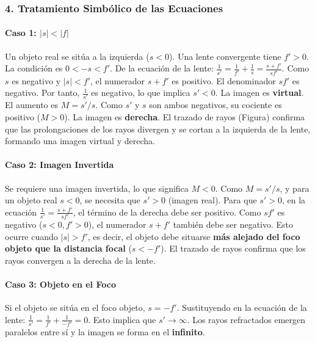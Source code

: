 \subsubsection*{4. Tratamiento Simbólico de las Ecuaciones}
\paragraph*{Caso 1: $|s| < |f|$}
Un objeto real se sitúa a la izquierda ($s<0$). Una lente convergente tiene $f' > 0$. La condición es $0 < -s < f'$.
De la ecuación de la lente: $\frac{1}{s'} = \frac{1}{f'} + \frac{1}{s} = \frac{s+f'}{s f'}$. Como $s$ es negativo y $|s| < f'$, el numerador $s+f'$ es positivo. El denominador $s f'$ es negativo. Por tanto, $\frac{1}{s'}$ es negativo, lo que implica $s'<0$. La imagen es \textbf{virtual}.
El aumento es $M = s'/s$. Como $s'$ y $s$ son ambos negativos, su cociente es positivo ($M>0$). La imagen es \textbf{derecha}.
El trazado de rayos (Figura) confirma que las prolongaciones de los rayos divergen y se cortan a la izquierda de la lente, formando una imagen virtual y derecha.

\paragraph*{Caso 2: Imagen Invertida}
Se requiere una imagen invertida, lo que significa $M<0$. Como $M = s'/s$, y para un objeto real $s<0$, se necesita que $s'>0$ (imagen real).
Para que $s'>0$, en la ecuación $\frac{1}{s'} = \frac{s+f'}{s f'}$, el término de la derecha debe ser positivo. Como $s f'$ es negativo ($s<0, f'>0$), el numerador $s+f'$ también debe ser negativo. Esto ocurre cuando $|s| > f'$, es decir, el objeto debe situarse \textbf{más alejado del foco objeto que la distancia focal} ($s < -f'$). El trazado de rayos confirma que los rayos convergen a la derecha de la lente.

\paragraph*{Caso 3: Objeto en el Foco}
Si el objeto se sitúa en el foco objeto, $s = -f'$. Sustituyendo en la ecuación de la lente:
$\frac{1}{s'} = \frac{1}{f'} + \frac{1}{-f'} = 0$.
Esto implica que $s' \to \infty$. Los rayos refractados emergen paralelos entre sí y la imagen se forma en el \textbf{infinito}.

